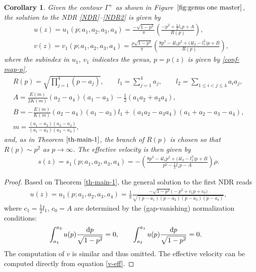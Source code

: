 \documentclass[pdftex]{sigma}
\numberwithin{equation}{section}
\newtheorem{Corollary}[Theorem]{Corollary}
\def\ra{\rightarrow}
\newcommand{\G}{\Gamma}
\def\G{\Gamma}
\begin{document}
\begin{Corollary}
Given the contour $\G^+$ as shown in Figure~$\ref{fig:genus one master}$, the solution to the NDR \eqref{NDR}--\eqref{NDR2} is given by
\begin{align}
&u(z)=u_1(p;a_1,a_2,a_3,a_4)=\frac{-\sqrt{1-p^2}}{\pi}\left(\frac{-p^2+\frac{1}{2}l_1p+A}{R(p)}\right),\label{g1-DOS}\\
&v(z)=v_1(p;a_1,a_2,a_3,a_4)=\frac{\rho\sqrt{1-p^2}}{\pi}\left(\frac{8p^3-4l_1p^2+\bigl(4l_2-l_1^2\bigr)p+B}{R(p)}\right), \label{g1-DOS-v}
\end{align}
where the subindex in $u_1$, $v_1$ indicates the genus, $p=p(z)$ is given by \eqref{conf-map-p},
\begin{gather*}
R(p)=\sqrt{\prod_{j=1}^4(p-a_j)}, \qquad 	l_1=\sum_{j=1}^4a_j, \qquad l_2=\sum_{1\leq i<j\leq 4 }a_ia_j,\\
A=\frac{E(m)}{2K(m)}(a_2-a_4)(a_1-a_3)-\frac{1}{2}(a_1a_2+a_3a_4),\\
B=-\frac{E(m)}{K(m)}(a_2-a_4)(a_1-a_3)l_1+(a_1a_2-a_3a_4)(a_1+a_2-a_3-a_4),\\
m=\frac{(a_1-a_2)(a_3-a_4)}{(a_1-a_3)(a_2-a_4)},
\end{gather*}
and, as in Theorem $\ref{th-main-1}$, the branch of $R(p)$ is chosen so that $R(p)\sim p^2$ as ${p\ra \infty}$.
The effective velocity is then given by
\begin{align}
s(z)=s_1(p;a_1,a_2,a_3,a_4)=-\left(\frac{8p^3-4l_1p^2+\bigl(4l_2-l_1^2\bigr)p+B}{p^2-\frac{1}{2}l_1p-A}\right)\rho.\label{g1-effv}
\end{align}
\end{Corollary}
\begin{proof}
Based on Theorem \ref{th-main-1}, the general solution to the first NDR reads
\begin{align*}
u(z)=u_1(p;a_1,a_2,a_3,a_4)=\frac{1}{\pi}\frac{-\sqrt{1-p^2}\bigl(-p^2+c_1p+c_0\bigr)}{\sqrt{(p-a_1)(p-a_2)(p-a_3)(p-a_4)}},
\end{align*}
where $c_1=\frac{1}{2}l_1$, $c_0=A$ are determined by the (gap-vanishing) normalization conditions:
\begin{align*}
&\int_{a_4}^{a_3}u(p)\frac{{\rm d}p}{\sqrt{1-p^2}}=0,\qquad
\int_{a_2}^{a_1}u(p)\frac{{\rm d}p}{\sqrt{1-p^2}}=0.
\end{align*}
The computation of $v$ is similar and thus omitted. The effective velocity can be computed directly from equation \eqref{v-eff}.
\end{proof}
\end{document}
